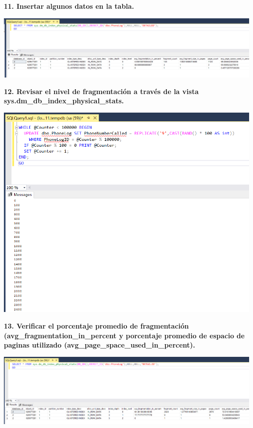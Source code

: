 \documentclass{article}
\begin{document}
\textbf{11.  Insertar algunos datos en la tabla.}

    \begin{center}
		\includegraphics[width=15cm]{./images/15} 
	\end{center}

\newpage
\textbf{12. Revisar el nivel de fragmentación a través de la vista sys.dm_db_index_physical_stats.}

    \begin{center}
		\includegraphics[width=15cm]{./images/16} 
	\end{center}


\textbf{13. Verificar el porcentaje promedio de fragmentación (avg_fragmentation_in_percent y porcentaje promedio de espacio de paginas utilizado (avg_page_space_used_in_percent).}

    \begin{center}
		\includegraphics[width=15cm]{./images/17} 
	\end{center}
\end{document}
